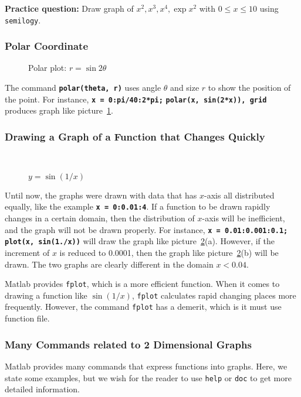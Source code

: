 \vn \textbf{Practice question:} Draw graph of $x^{2}, x^{3}, x^{4}, \exp{x^{2}}$ with $ 0\leq x \leq 10$ using {\tt semilogy}.

\subsubsection{Polar Coordinate} 

\begin{figure}[]
\center {} \caption{Polar plot: $r=\sin 2\theta$ } \label{polar}
\end{figure}

The command \texttt{\textbf{polar(theta, r)}} uses angle $\theta$ and size $r$ to show the position of the point. For instance, \matlabp\texttt{\textbf{x = 0:pi/40:2*pi;}} \matlabp\texttt{\textbf{polar(x, sin(2*x)), grid}} \vn produces graph like picture~\ref{polar}.

\subsubsection{Drawing a Graph of a Function that Changes Quickly}

\begin{figure}
\centering
\mbox{%
 \quad
{}} \caption{$y
=\sin(1/x)$} \label{sin}
\end{figure}

Until now, the graphs were drawn with data that has $x$-axis all distributed equally, like the example \texttt{\textbf{x = 0:0.01:4}}. If a function to be drawn rapidly changes in a certain domain, then the distribution of $x$-axis will be inefficient, and the graph will not be drawn properly. For instance, \matlabp\texttt{\textbf{x = 0.01:0.001:0.1;}} \matlabp\texttt{\textbf{plot(x, sin(1./x))}} \vn will draw the graph like picture~\ref{sin}(a). However, if the increment of $x$ is reduced to 0.0001, then the graph like picture~\ref{sin}(b) will be drawn. The two graphs are clearly different in the domain $x < 0.04$.

\vv Matlab provides {\tt fplot}, which is a more efficient function. When it comes to drawing a function like $\sin(1/x)$, {\tt fplot} calculates rapid changing places more frequently. However, the command {\tt fplot} has a demerit, which is it must use function file.

\subsubsection{Many Commands related to 2 Dimensional Graphs}
Matlab provides many commands that express functions into graphs. Here, we state some examples, but we wish for the reader to use {\tt help} or {\tt doc} to get more detailed information.

